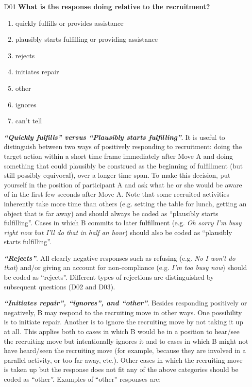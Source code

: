 \documentclass[output=paper]{langsci/langscibook}
\begin{document}
\begin{description}
\item
D01  \textbf{What is the response doing relative to the recruitment?}

\begin{enumerate}
\item {quickly fulfills or provides assistance}
\item {plausibly starts fulfilling or providing assistance}
\item {rejects}
\item {initiates repair}
\item {other}
\item {ignores}
\item {can’t tell}
\end{enumerate}

\textbf{\textit{“Quickly fulfills” versus “Plausibly starts fulfilling”}}. It is useful to distinguish between two ways of positively responding to recruitment: doing the target action within a short time frame immediately after Move A and doing something that could plausibly be construed as the beginning of fulfillment (but still possibly equivocal), over a longer time span. To make this decision, put yourself in the position of participant A and ask what he or she would be aware of in the first few seconds after Move A. Note that some recruited activities inherently take more time than others (e.g. setting the table for lunch, getting an object that is far away) and should always be coded as “plausibly starts fulfilling”. Cases in which B commits to later fulfillment (e.g. \textit{Oh sorry I’m busy right now but I’ll do that in half an hour}) should also be coded as “plausibly starts fulfilling”.

\textbf{\textit{“Rejects”}}. All clearly negative responses such as refusing (e.g. \textit{No I won’t do that}) and/or giving an account for non-compliance (e.g. \textit{I’m too busy now}) should be coded as “rejects”. Different types of rejections are distinguished by subsequent questions (D02 and D03).

\textbf{\textit{“Initiates repair”, “ignores”, and “other”}}. Besides responding positively or negatively, B may respond to the recruiting move in other ways. One possibility is to initiate repair. Another is to ignore the recruiting move by not taking it up at all. This applies both to cases in which B would be in a position to hear/see the recruiting move but intentionally ignores it and to cases in which B might not have heard/seen the recruiting move (for example, because they are involved in a parallel activity, or too far away, etc.). Other cases in which the recruiting move is taken up but the response does not fit any of the above categories should be coded as “other”. Examples of “other” responses are:


\end{description}
\end{document}
